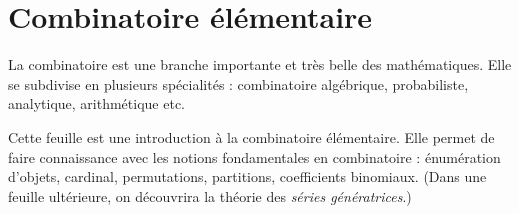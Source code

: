 


\chapter{Combinatoire élémentaire}

La combinatoire est une branche importante et très belle des mathématiques. Elle se subdivise en plusieurs spécialités : combinatoire algébrique, probabiliste, analytique, arithmétique  etc.

Cette feuille est une introduction à la combinatoire élémentaire. Elle permet de faire connaissance avec les notions fondamentales en combinatoire : énumération d'objets, cardinal, permutations, partitions, coefficients binomiaux. (Dans une feuille ultérieure, on découvrira la théorie des \emph{séries génératrices}.)

